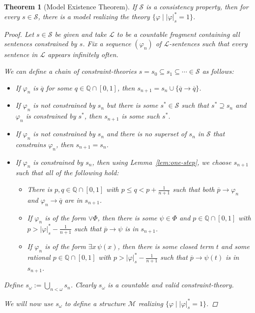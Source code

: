 \documentclass{amsart}
\newtheorem{theorem}{Theorem}[section]
\theoremstyle{definition}
\numberwithin{equation}{theorem}
\renewcommand{\phi}{\varphi}
\newcommand{\Q}{\mathbb{Q}}
\newcommand{\where}{\mid}
\newcommand{\unvee}{{\vee}}
\newcommand{\rat}[1]{{\overline{#1}}}
\newcommand{\narrow}[1]{\xrightarrow{#1}}
\renewcommand{\to}{\narrow{}}
\newcommand{\frag}{\mathcal{L}}
\begin{document}
\begin{theorem}[Model Existence Theorem]
  If $\mathscr{S}$ is a consistency property, then for every $s\in \mathscr{S}$, there is a model realizing the theory $\{\phi\where |\phi|^*_s=1\}$.
  \begin{proof}
    Let $s\in \mathscr{S}$ be given and take $\frag$ to be a countable fragment containing all sentences constrained by $s$.
    Fix a sequence $(\phi_n)$ of $\mathcal L$-sentences such that every sentence in $\mathcal L$ appears infinitely often.
    
    We can define a chain of constraint-theories $s=s_0\subseteq s_1\subseteq\cdots\in \mathscr{S}$ as follows:
    \begin{itemize}
    \item If $\phi_n$ is $\rat q$ for some $q\in\Q\cap[0,1]$, then $s_{n+1}=s_n\cup\{\rat q\to\rat q\}$.
    \item If $\phi_n$ is not constrained by $s_n$ but there is some $s^*\in \mathscr{S}$ such that $s^*\supseteq s_n$ and $\phi_n$ is constrained by $s^*$, then $s_{n+1}$ is some such $s^*$.
    \item If $\phi_n$ is not constrained by $s_n$ and there is no superset of $s_n$ in $\mathscr{S}$ that constrains $\phi_n$, then $s_{n+1}=s_n$.
    \item If $\phi_n$ is constrained by $s_n$, then using Lemma~\ref{lem:one-step}, we choose $s_{n+1}$ such that all of the following hold:
	    \begin{itemize}
		  \item 
		    There is $p,q\in\Q\cap[0,1]$ with $p\leq q<p+\tfrac1{n+1}$ such that both $\rat p\to\phi_n$ and $\phi_n\to\rat q$ are in $s_{n+1}$.
		  \item 
		    If $\phi_n$ is of the form $\unvee\Phi$, then there is some $\psi\in\Phi$ and $p\in\Q\cap[0,1]$ with $p>|\phi|^*_s-\tfrac1{n+1}$ such that $\rat p\to\psi$ is in $s_{n+1}$.
		  \item 
		    If $\phi_n$ is of the form $\exists x\,\psi(x)$, then there is some closed term $t$ and some rational $p\in\Q\cap[0,1]$ with $p>|\phi|^*_s-\tfrac{1}{n+1}$ such that $\rat p\to\psi(t)$ is in $s_{n+1}$.
		  \end{itemize}
    \end{itemize}	  
	  Define $s_\omega:=\bigcup\limits_{n<\omega}s_n$.
	  Clearly $s_\omega$ is a countable and valid constraint-theory.
	  
	  We will now use $s_\omega$ to define a structure $\mathcal M$ realizing $\{\phi\where|\phi|^*_s=1\}$.
    

\end{proof}
\end{theorem}
\end{document}
